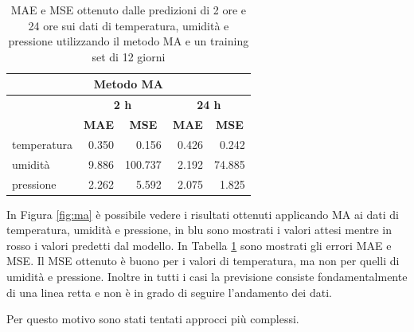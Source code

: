 \documentclass{article}
\begin{document}
\begin{table}
\centering
\begin{tabular}{l|r|r|r|r}
\multicolumn{5}{c}{{\cellcolor[rgb]{0.875,0.875,0.875}} Metodo MA}                                                                                                                            \\ 
\hline
\rowcolor[rgb]{0.753,0.753,0.753}             & \multicolumn{2}{c|}{\textbf{ 2 h}}                                    & \multicolumn{2}{c}{\textbf{24 h }}                                    \\
\rowcolor[rgb]{0.753,0.753,0.753}             & \multicolumn{1}{c|}{\textbf{MAE}} & \multicolumn{1}{c|}{\textbf{MSE}} & \multicolumn{1}{c|}{\textbf{MAE}} & \multicolumn{1}{c}{\textbf{MSE}}  \\ 
\hline
\rowcolor[rgb]{0.875,0.875,0.875} temperatura & 0.350                             & 0.156                             & 0.426                             & 0.242                             \\
umidità                                       & 9.886                             & 100.737                           & 2.192                             & 74.885                            \\
\rowcolor[rgb]{0.875,0.875,0.875} pressione   & 2.262                             & 5.592                             & 2.075                             & 1.825                            
\end{tabular}
\caption{MAE e MSE ottenuto dalle predizioni di 2 ore e 24 ore sui dati di temperatura, umidità e pressione utilizzando il metodo MA e un training set di 12 giorni}
\label{tab:ma}
\end{table}


In Figura \ref{fig:ma} è possibile vedere i risultati ottenuti applicando MA ai dati di temperatura, umidità e pressione, in blu sono mostrati i valori attesi mentre in rosso i valori predetti dal modello. In Tabella \ref{tab:ma} sono mostrati gli errori MAE e MSE. Il MSE ottenuto è buono per i valori di temperatura, ma non per quelli di umidità e pressione. Inoltre in tutti i casi la previsione consiste fondamentalmente di una linea retta e non è in grado di seguire l'andamento dei dati.

Per questo motivo sono stati tentati approcci più complessi.
\end{document}

